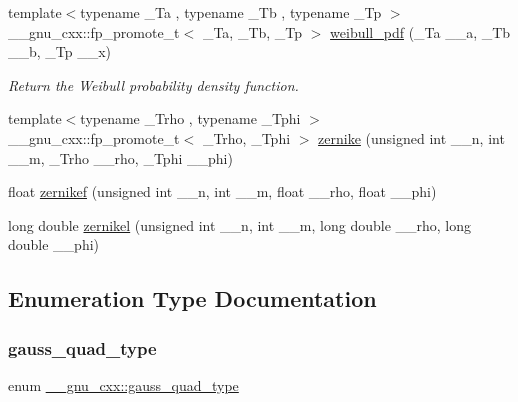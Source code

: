 \begin{DoxyCompactItemize}
{\footnotesize template$<$typename \+\_\+\+Ta , typename \+\_\+\+Tb , typename \+\_\+\+Tp $>$ }\\\+\_\+\+\_\+gnu\+\_\+cxx\+::fp\+\_\+promote\+\_\+t$<$ \+\_\+\+Ta, \+\_\+\+Tb, \+\_\+\+Tp $>$ \hyperlink{group__mathsf__gnu_gacfbb6ca9df8e0aa092ff4406baff597c}{weibull\+\_\+pdf} (\+\_\+\+Ta \+\_\+\+\_\+a, \+\_\+\+Tb \+\_\+\+\_\+b, \+\_\+\+Tp \+\_\+\+\_\+x)
\begin{DoxyCompactList}\small\item\em Return the Weibull probability density function. \end{DoxyCompactList}\item 
{\footnotesize template$<$typename \+\_\+\+Trho , typename \+\_\+\+Tphi $>$ }\\\+\_\+\+\_\+gnu\+\_\+cxx\+::fp\+\_\+promote\+\_\+t$<$ \+\_\+\+Trho, \+\_\+\+Tphi $>$ \hyperlink{group__mathsf__gnu_gaaed33f29c1eb1d2c5b9590fe2e57151c}{zernike} (unsigned int \+\_\+\+\_\+n, int \+\_\+\+\_\+m, \+\_\+\+Trho \+\_\+\+\_\+rho, \+\_\+\+Tphi \+\_\+\+\_\+phi)
\item 
float \hyperlink{group__mathsf__gnu_gababce1066ecef7258070b9b7fcea975f}{zernikef} (unsigned int \+\_\+\+\_\+n, int \+\_\+\+\_\+m, float \+\_\+\+\_\+rho, float \+\_\+\+\_\+phi)
\item 
long double \hyperlink{group__mathsf__gnu_ga9236dd8545b448da9cb05dd8b7cf6811}{zernikel} (unsigned int \+\_\+\+\_\+n, int \+\_\+\+\_\+m, long double \+\_\+\+\_\+rho, long double \+\_\+\+\_\+phi)
\end{DoxyCompactItemize}


\subsection{Enumeration Type Documentation}
\mbox{\label{namespace____gnu__cxx_a2ed4d746fa11452ef08bae893e031cb3}} 
\subsubsection{\texorpdfstring{gauss\+\_\+quad\+\_\+type}{gauss\_quad\_type}}
{\footnotesize\ttfamily enum \hyperlink{namespace____gnu__cxx_a2ed4d746fa11452ef08bae893e031cb3}{\+\_\+\+\_\+gnu\+\_\+cxx\+::gauss\+\_\+quad\+\_\+type}}



